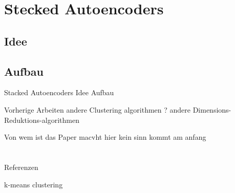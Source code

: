 \documentclass{beamer}
\begin{document}
\section[]{Stecked Autoencoders}
	\subsection{Idee}
	\subsection{Aufbau}
\begin{frame}[t]{Stacked Autoencoders}\vspace{4pt}
Idee
Aufbau
\end{frame}

\begin{frame}[t]{Vorherige Arbeiten}\vspace{4pt}
andere Clustering algorithmen ?
andere Dimensions-Reduktions-algorithmen
\end{frame}

\begin{frame}[t]{Von wem ist das Paper}\vspace{4pt}
macvht hier kein sinn kommt am anfang
\end{frame}


\section[]{}
\begin{frame}[t]{Referenzen}\vspace{4pt}
\begin{thebibliography}{10}
\alert{k-means clustering}
\end{thebibliography}

\end{frame}
\end{document}
